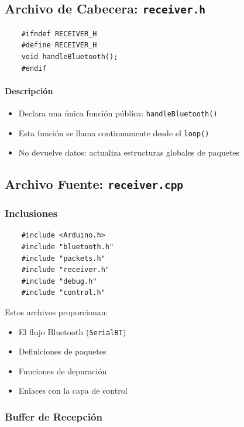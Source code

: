 \documentclass[12pt,a4paper]{article}
\newcommand{\ardfnDG}[1]{\texttt{\textcolor{arduinoTeal}{#1}}}
\newcommand{\ardfnOR}[1]{\texttt{\textcolor{arduinoOrange}{#1}}}
\begin{document}
\subsection{Archivo de Cabecera: \ardfnDG{receiver.h}}

\begin{lstlisting}
	#ifndef RECEIVER_H
	#define RECEIVER_H
	void handleBluetooth();
	#endif
\end{lstlisting}

\paragraph{Descripción}

\begin{itemize}
	\item Declara una única función pública: \ardfnOR{handleBluetooth}\texttt{()}
	\item Esta función se llama continuamente desde el \texttt{loop()}
	\item No devuelve datos: actualiza estructuras globales de paquetes
\end{itemize}

\subsection{Archivo Fuente: \ardfnDG{receiver.cpp}}

\subsubsection{Inclusiones}

\begin{lstlisting}
	#include <Arduino.h>
	#include "bluetooth.h"
	#include "packets.h"
	#include "receiver.h"
	#include "debug.h"
	#include "control.h"
\end{lstlisting}

Estos archivos proporcionan:

\begin{itemize}
	\item El flujo Bluetooth (\texttt{SerialBT})
	\item Definiciones de paquetes
	\item Funciones de depuración
	\item Enlaces con la capa de control
\end{itemize}

\subsubsection{Buffer de Recepción}
\end{document}
